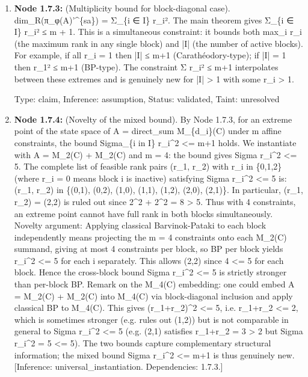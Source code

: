 \documentclass{article}
\begin{document}
\begin{enumerate}
\begin{enumerate}
\item \textbf{Node 1.7.3:} (Multiplicity bound for block-diagonal case). dim\_R(π\_φ(A)'\textasciicircum{}\{sa\}) = Σ\_\{i ∈ I\} r\_i². The main theorem gives Σ\_\{i ∈ I\} r\_i² ≤ m + 1. This is a simultaneous constraint: it bounds both max\_i r\_i (the maximum rank in any single block) and |I| (the number of active blocks). For example, if all r\_i = 1 then |I| ≤ m+1 (Carathéodory-type); if |I| = 1 then r\_1² ≤ m+1 (BP-type). The constraint Σ r\_i² ≤ m+1 interpolates between these extremes and is genuinely new for |I| > 1 with some r\_i > 1.

  Type: claim, Inference: assumption, Status: validated, Taint: unresolved

\item \textbf{Node 1.7.4:} (Novelty of the mixed bound). By Node 1.7.3, for an extreme point of the state space of A = direct\_sum M\_\{d\_i\}(C) under m affine constraints, the bound Sigma\_\{i in I\} r\_i\textasciicircum{}2 <= m+1 holds. We instantiate with A = M\_2(C) + M\_2(C) and m = 4: the bound gives Sigma r\_i\textasciicircum{}2 <= 5. The complete list of feasible rank pairs (r\_1, r\_2) with r\_i in \{0,1,2\} (where r\_i = 0 means block i is inactive) satisfying Sigma r\_i\textasciicircum{}2 <= 5 is: (r\_1, r\_2) in \{(0,1), (0,2), (1,0), (1,1), (1,2), (2,0), (2,1)\}. In particular, (r\_1, r\_2) = (2,2) is ruled out since 2\textasciicircum{}2 + 2\textasciicircum{}2 = 8 > 5. Thus with 4 constraints, an extreme point cannot have full rank in both blocks simultaneously. Novelty argument: Applying classical Barvinok-Pataki to each block independently means projecting the m = 4 constraints onto each M\_2(C) summand, giving at most 4 constraints per block, so BP per block yields r\_i\textasciicircum{}2 <= 5 for each i separately. This allows (2,2) since 4 <= 5 for each block. Hence the cross-block bound Sigma r\_i\textasciicircum{}2 <= 5 is strictly stronger than per-block BP. Remark on the M\_4(C) embedding: one could embed A = M\_2(C) + M\_2(C) into M\_4(C) via block-diagonal inclusion and apply classical BP to M\_4(C). This gives (r\_1+r\_2)\textasciicircum{}2 <= 5, i.e. r\_1+r\_2 <= 2, which is sometimes stronger (e.g. rules out (1,2)) but is not comparable in general to Sigma r\_i\textasciicircum{}2 <= 5 (e.g. (2,1) satisfies r\_1+r\_2 = 3 > 2 but Sigma r\_i\textasciicircum{}2 = 5 <= 5). The two bounds capture complementary structural information; the mixed bound Sigma r\_i\textasciicircum{}2 <= m+1 is thus genuinely new. [Inference: universal\_instantiation. Dependencies: 1.7.3.]


\end{enumerate}
\end{enumerate}
\end{document}
